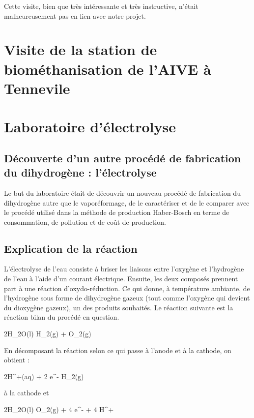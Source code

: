 Cette visite, bien que très intéressante et très instructive, n'était
malheureusement pas en lien avec notre projet.

\section{Visite de la station de biométhanisation de l'AIVE à Tennevile}

\section{Laboratoire d'électrolyse}
\subsection{Découverte d'un autre procédé de fabrication du dihydrogène : l'électrolyse}
Le but du laboratoire était de découvrir un nouveau procédé de
fabrication du dihydrogène autre que le vaporéformage, de le
caractériser et de le comparer avec le procédé utilisé dans la
méthode de production Haber-Bosch en terme de consommation, de
pollution et de coût de production.

\subsection{Explication de la réaction}
L'électrolyse de l'eau consiste à briser les liaisons entre
l'oxygène et l'hydrogène de l'eau à l'aide d'un courant électrique.
Ensuite, les deux composés prennent part à une réaction d'oxydo-réduction.
Ce qui donne, à température ambiante, de l'hydrogène sous forme de
dihydrogène gazeux (tout comme l'oxygène qui devient du dioxygène gazeux),
un des produits souhaités. Le réaction suivante est la réaction bilan du
procédé en question.

\begin{chemmath}
	2H_2O(l)  H_2(g) + O_2(g)
\end{chemmath}

En décomposant la réaction selon ce qui passe à l'anode et à la cathode,
on obtient :

\begin{chemmath}
	2H^+(aq) + 2 e^- \rightleftharpoons H_2(g)
\end{chemmath}

à la cathode et

\begin{chemmath}
	2H_2O(l) \rightleftharpoons O_2(g) + 4 e^- + 4 H^+
\end{chemmath}

